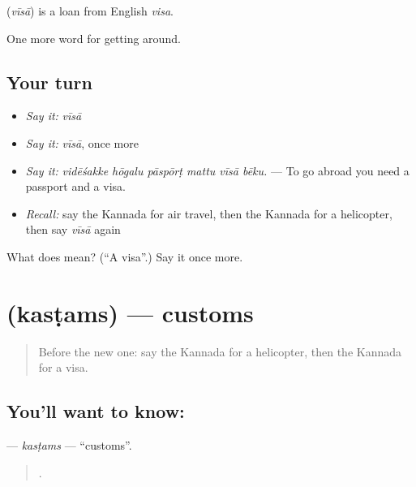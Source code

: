 \begin{cousinweb}
\textbf{} (\emph{vīsā}) is a loan from English \emph{visa}.
\end{cousinweb}

\begin{grammarlens}[title={What you've built}]
One more word for getting around.
\end{grammarlens}

\subsection*{Your turn}
\begin{itemize}
\raggedright
  \item \emph{Say it:} \emph{vīsā}
  \item \emph{Say it:} \emph{vīsā}, once more
  \item \emph{Say it:} \emph{vidēśakke hōgalu pāspōrṭ mattu vīsā bēku.} — To go abroad you need a passport and a visa.
  \item \emph{Recall:} say the Kannada for air travel, then the Kannada for a helicopter, then say \emph{vīsā} again
\end{itemize}

\begin{tcolorbox}[breakable,colback=teal!4,colframe=teal!35!black,title={Before you move on}]
What does  mean? (\textquotedblleft{}A visa\textquotedblright{}.) Say it once more.
\end{tcolorbox}
\section[\texorpdfstring{\kn{ಕಸ್ಟಮ್ಸ್} (kasṭams)}{ಕಸ್ಟಮ್ಸ್ (kasṭams)}]{ (kasṭams) — customs}

\label{lesson:KA-C439-kastams}



\begin{quote}
Before the new one: say the Kannada for a helicopter, then the Kannada for a visa.
\end{quote}

\subsection*{You'll want to know: }
\textbf{} — \emph{kasṭams} — \textquotedblleft{}customs\textquotedblright{}.

\begin{quote}
    .
\end{quote}

